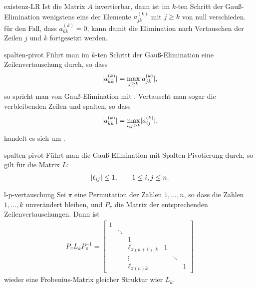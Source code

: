 \begin{Satz}{existenz-LR}
  Ist die Matrix $A$ invertierbar, dann ist im $k$-ten Schritt der
  Gauß-Elimination wenigstens eins der Elemente $a^{(k)}_{jk}$ mit
  $j\ge k$ von null verschieden. für den Fall, dass
  $a^{(k)}_{kk} = 0$, kann damit die Elimination nach Vertauschen der
  Zeilen $j$ und $k$ fortgesetzt werden.
\end{Satz}

\begin{Definition}{spalten-pivot}
  Führt man im $k$-ten Schritt der Gauß-Elimination eine
  Zeilenvertauschung durch, so dass
  \begin{gather}
    \lvert a^{(k)}_{kk}\rvert = \max_{j\ge k} \lvert a^{(k)}_{jk}\rvert,
  \end{gather}
  so spricht man von Gauß-Elimination mit
  . Vertauscht man sogar die verbleibenden
  Zeilen und spalten, so dass
  \begin{gather}
    \lvert a^{(k)}_{kk}\rvert = \max_{i,j\ge k} \lvert a^{(k)}_{ij}\rvert,
  \end{gather}
  handelt es sich um .
\end{Definition}

\begin{Lemma}{spalten-pivot}
  Führt man die Gauß-Elimination mit Spalten-Pivotierung durch, so gilt
  für die Matrix $L$:
  \begin{gather}
    \lvert\ell_{ij}\rvert \le 1,\qquad1\le i,j\le n.
  \end{gather}
\end{Lemma}

\begin{Lemma}{l-p-vertauschung}
  Sei $\pi$ eine Permutation der Zahlen $1,\dots,n$, so dass die
  Zahlen $1,\dots,k$ unverändert bleiben, und $P_{\pi}$ die Matrix der
  entsprechenden Zeilenvertauschungen. Dann ist
  \begin{gather}
    P_\pi L_k P_\pi^{-1} =
    \begin{bmatrix}
      1 & & & & & \\
      &\ddots & & & & \\
      &   & 1& & &\\
      &   & \ell_{\pi(k+1),k}&1 & &\\
      &   & \vdots& &\ddots &\\
      &   & \ell_{\pi(n)k}& & &1
    \end{bmatrix}
  \end{gather}
  wieder eine Frobenius-Matrix gleicher Struktur wier $L_k$.
\end{Lemma}

